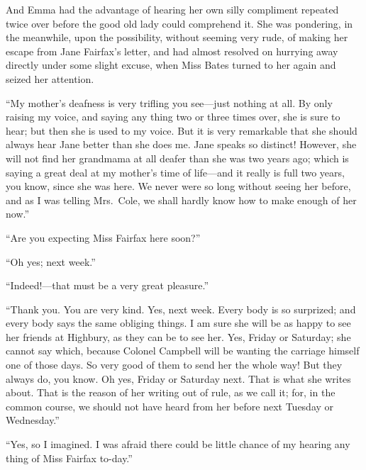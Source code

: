 And Emma had the advantage of hearing her own silly compliment
repeated twice over before the good old lady could comprehend it.
She was pondering, in the meanwhile, upon the possibility, without seeming
very rude, of making her escape from Jane Fairfax's letter, and had
almost resolved on hurrying away directly under some slight excuse,
when Miss Bates turned to her again and seized her attention.

``My mother's deafness is very trifling you see---just nothing at all.
By only raising my voice, and saying any thing two or three times over,
she is sure to hear; but then she is used to my voice.  But it is very
remarkable that she should always hear Jane better than she does me.
Jane speaks so distinct!  However, she will not find her grandmama
at all deafer than she was two years ago; which is saying a great
deal at my mother's time of life---and it really is full two years,
you know, since she was here.  We never were so long without seeing
her before, and as I was telling Mrs.\ Cole, we shall hardly know
how to make enough of her now.''

``Are you expecting Miss Fairfax here soon?''

``Oh yes; next week.''

``Indeed!---that must be a very great pleasure.''

``Thank you.  You are very kind.  Yes, next week.  Every body is
so surprized; and every body says the same obliging things.  I am
sure she will be as happy to see her friends at Highbury, as they
can be to see her.  Yes, Friday or Saturday; she cannot say which,
because Colonel Campbell will be wanting the carriage himself one
of those days.  So very good of them to send her the whole way!
But they always do, you know.  Oh yes, Friday or Saturday next.
That is what she writes about.  That is the reason of her writing out
of rule, as we call it; for, in the common course, we should not have
heard from her before next Tuesday or Wednesday.''

``Yes, so I imagined.  I was afraid there could be little chance
of my hearing any thing of Miss Fairfax to-day.''

